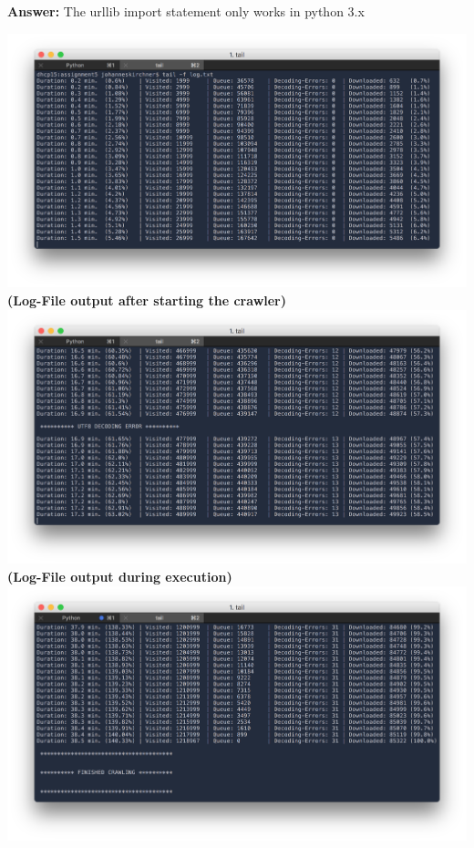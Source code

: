 \documentclass{WeSTassignment}
\begin{document}
\textbf{Answer:}
The urllib import statement only works in python 3.x

\hspace*{-100px}
\includegraphics[width=610px]{log_beginning}
\textbf{(Log-File output after starting the crawler)}\\
\hspace*{-100px}
\includegraphics[width=610px]{log_mid_error}
\textbf{(Log-File output during execution)}\\
\hspace*{-100px}
\includegraphics[width=610px]{log_end}
\end{document}
